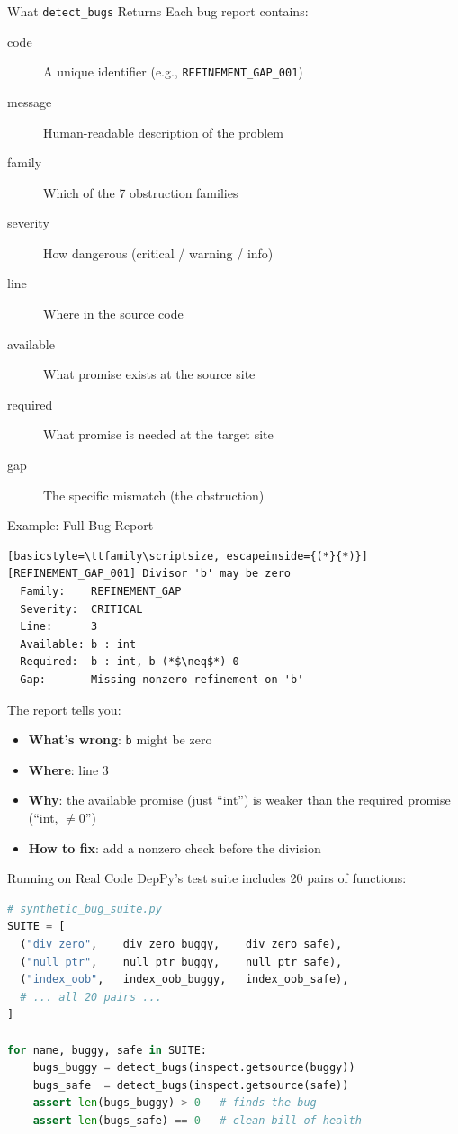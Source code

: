 \documentclass[aspectratio=169,10pt]{beamer}
\begin{document}
\begin{frame}{What \texttt{detect\_bugs} Returns}
Each bug report contains:
\vspace{0.3em}
\begin{description}
  \item[code] A unique identifier (e.g., \texttt{REFINEMENT\_GAP\_001})
  \item[message] Human-readable description of the problem
  \item[family] Which of the 7 obstruction families
  \item[severity] How dangerous (critical / warning / info)
  \item[line] Where in the source code
  \item[available] What promise exists at the source site
  \item[required] What promise is needed at the target site
  \item[gap] The specific mismatch (the obstruction)
\end{description}
\end{frame}

\begin{frame}[fragile]{Example: Full Bug Report}
\begin{lstlisting}[basicstyle=\ttfamily\scriptsize, escapeinside={(*}{*)}]
[REFINEMENT_GAP_001] Divisor 'b' may be zero
  Family:    REFINEMENT_GAP
  Severity:  CRITICAL
  Line:      3
  Available: b : int
  Required:  b : int, b (*$\neq$*) 0
  Gap:       Missing nonzero refinement on 'b'
\end{lstlisting}
\vspace{0.3em}
The report tells you:
\begin{itemize}
  \item \textbf{What's wrong}: \texttt{b} might be zero
  \item \textbf{Where}: line 3
  \item \textbf{Why}: the available promise (just ``int'') is weaker than the required promise (``int, $\neq 0$'')
  \item \textbf{How to fix}: add a nonzero check before the division
\end{itemize}
\end{frame}

\begin{frame}[fragile]{Running on Real Code}
DepPy's test suite includes 20 pairs of functions:
\vspace{0.3em}
\begin{lstlisting}[language=Python, basicstyle=\ttfamily\scriptsize]
# synthetic_bug_suite.py
SUITE = [
  ("div_zero",    div_zero_buggy,    div_zero_safe),
  ("null_ptr",    null_ptr_buggy,    null_ptr_safe),
  ("index_oob",   index_oob_buggy,   index_oob_safe),
  # ... all 20 pairs ...
]

for name, buggy, safe in SUITE:
    bugs_buggy = detect_bugs(inspect.getsource(buggy))
    bugs_safe  = detect_bugs(inspect.getsource(safe))
    assert len(bugs_buggy) > 0   # finds the bug
    assert len(bugs_safe) == 0   # clean bill of health
\end{lstlisting}
\end{frame}
\end{document}
